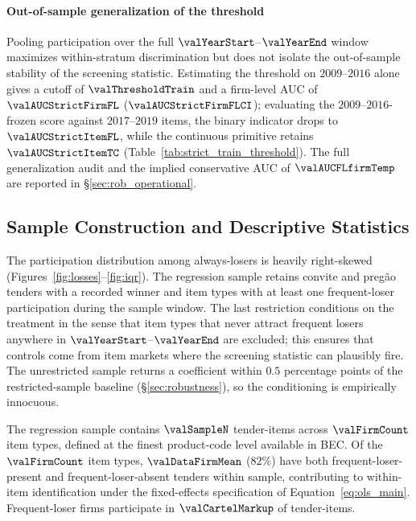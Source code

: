 \paragraph{Out-of-sample generalization of the threshold}
Pooling participation over the full $\valYearStart$--$\valYearEnd$
window maximizes within-stratum discrimination but does not
isolate the out-of-sample stability of the screening statistic.
Estimating the threshold on $2009$--$2016$ alone gives a cutoff
of $\valThresholdTrain$ and a firm-level AUC of
$\valAUCStrictFirmFL$ ($\valAUCStrictFirmFLCI$); evaluating the
$2009$--$2016$-frozen score against $2017$--$2019$ items, the
binary indicator drops to $\valAUCStrictItemFL$, while the
continuous primitive retains $\valAUCStrictItemTC$
(Table~\ref{tab:strict_train_threshold}). The full
generalization audit and the implied conservative AUC of
$\valAUCFLfirmTemp$ are reported in
§\ref{sec:rob_operational}.




\subsection{Sample Construction and Descriptive Statistics}
\label{sec:data_sample}

The participation distribution among always-losers is heavily
right-skewed (Figures~\ref{fig:losses}--\ref{fig:iqr}). The
regression sample retains convite and preg\~ao tenders with a
recorded winner and item types with at least one frequent-loser
participation during the sample window. The last restriction
conditions on the treatment in the sense that item types that
never attract frequent losers anywhere in
$\valYearStart$--$\valYearEnd$ are excluded; this ensures that
controls come from item markets where the screening statistic
can plausibly fire. The unrestricted sample returns a
coefficient within $0.5$ percentage points of the
restricted-sample baseline (§\ref{sec:robustness}), so the
conditioning is empirically innocuous.

The regression sample contains $\valSampleN$ tender-items across
$\valFirmCount$ item types, defined at the finest product-code
level available in BEC. Of the $\valFirmCount$ item types,
$\valDataFirmMean$ ($82\%$) have both frequent-loser-present
and frequent-loser-absent tenders within sample, contributing
to within-item identification under the fixed-effects
specification of Equation~\eqref{eq:ols_main}. Frequent-loser
firms participate in $\valCartelMarkup$ of tender-items.

